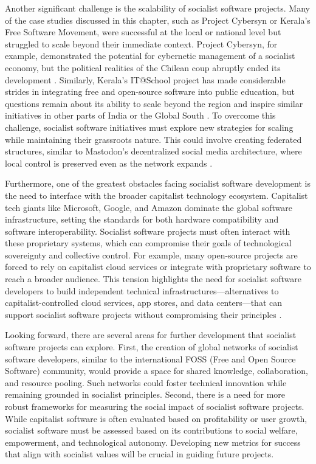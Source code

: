 \begin{refsection}
Another significant challenge is the scalability of socialist software projects. Many of the case studies discussed in this chapter, such as Project Cybersyn or Kerala’s Free Software Movement, were successful at the local or national level but struggled to scale beyond their immediate context. Project Cybersyn, for example, demonstrated the potential for cybernetic management of a socialist economy, but the political realities of the Chilean coup abruptly ended its development \cite[pp.~192]{medina2014}. Similarly, Kerala’s IT@School project has made considerable strides in integrating free and open-source software into public education, but questions remain about its ability to scale beyond the region and inspire similar initiatives in other parts of India or the Global South \cite[pp.~25]{kwet2021}. To overcome this challenge, socialist software initiatives must explore new strategies for scaling while maintaining their grassroots nature. This could involve creating federated structures, similar to Mastodon’s decentralized social media architecture, where local control is preserved even as the network expands \cite[pp.~126]{moody2002}.

Furthermore, one of the greatest obstacles facing socialist software development is the need to interface with the broader capitalist technology ecosystem. Capitalist tech giants like Microsoft, Google, and Amazon dominate the global software infrastructure, setting the standards for both hardware compatibility and software interoperability. Socialist software projects must often interact with these proprietary systems, which can compromise their goals of technological sovereignty and collective control. For example, many open-source projects are forced to rely on capitalist cloud services or integrate with proprietary software to reach a broader audience. This tension highlights the need for socialist software developers to build independent technical infrastructures—alternatives to capitalist-controlled cloud services, app stores, and data centers—that can support socialist software projects without compromising their principles \cite[pp.~46-47]{stallman2010}.

Looking forward, there are several areas for further development that socialist software projects can explore. First, the creation of global networks of socialist software developers, similar to the international FOSS (Free and Open Source Software) community, would provide a space for shared knowledge, collaboration, and resource pooling. Such networks could foster technical innovation while remaining grounded in socialist principles. Second, there is a need for more robust frameworks for measuring the social impact of socialist software projects. While capitalist software is often evaluated based on profitability or user growth, socialist software must be assessed based on its contributions to social welfare, empowerment, and technological autonomy. Developing new metrics for success that align with socialist values will be crucial in guiding future projects.


\end{refsection}
